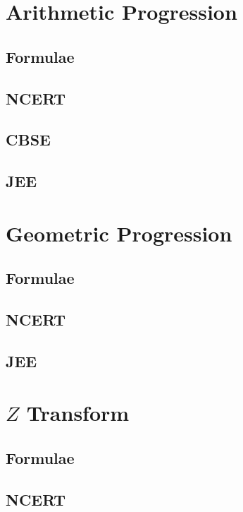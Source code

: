 \documentclass[journal]{IEEEtran}
\begin{document}
\tableofcontents

\newpage
\onecolumn


\renewcommand{\thetable}{\theenumi}

\section{Arithmetic Progression}
\subsection{Formulae}

\subsection{NCERT}

\subsection{CBSE}

\subsection{JEE}

\section{Geometric Progression}
\subsection{Formulae}

\subsection{NCERT}

\subsection{JEE}

\section{$Z$ Transform}
\subsection{Formulae}
%
\subsection{NCERT}

\end{document}
